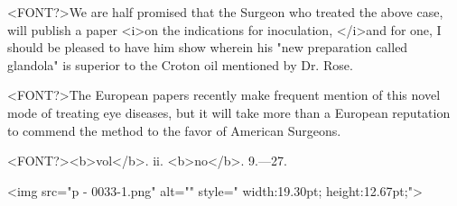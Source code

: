 <FONT?>We are half promised that the Surgeon who treated the above case,
will publish a paper <i>on the indications for inoculation, </i>and for one,
I should be pleased to have him show wherein his "new preparation
called glandola" is superior to the Croton oil mentioned by Dr. Rose.

<FONT?>The European papers recently make frequent mention of this novel
mode of treating eye diseases, but it will take more than a European
reputation to commend the method to the favor of American Surgeons.

<FONT?><b>vol</b>. ii. <b>no</b>. 9.---27.

<img src="p - 0033-1.png" alt="" style=" width:19.30pt; height:12.67pt;">\endinput

